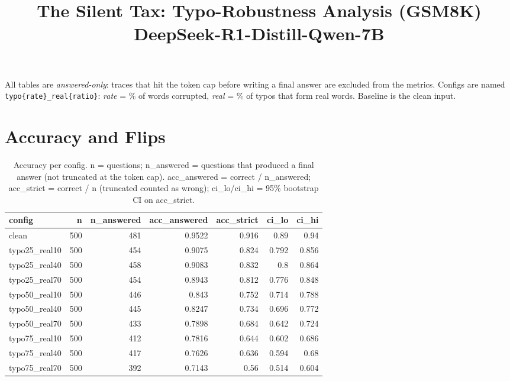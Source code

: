 \documentclass[11pt]{article}
\title{The Silent Tax: Typo-Robustness Analysis (GSM8K)\\\large DeepSeek-R1-Distill-Qwen-7B}
\date{}
\begin{document}
\maketitle
\noindent All tables are \emph{answered-only}: traces that hit the token cap before writing a final answer are excluded from the metrics. Configs are named \texttt{typo\{rate\}\_real\{ratio\}}: \emph{rate} = \% of words corrupted, \emph{real} = \% of typos that form real words. Baseline is the clean input.

\section*{Accuracy and Flips}
\begin{table}[H]
\centering
\caption{Accuracy per config. n = questions; n\_answered = questions that produced a final answer (not truncated at the token cap). acc\_answered = correct / n\_answered; acc\_strict = correct / n (truncated counted as wrong); ci\_lo/ci\_hi = 95\% bootstrap CI on acc\_strict.}
\small
\begin{adjustbox}{max width=\textwidth}
\begin{tabular}{lrrrrrr}
\toprule
\textbf{config} & \textbf{n} & \textbf{n\_answered} & \textbf{acc\_answered} & \textbf{acc\_strict} & \textbf{ci\_lo} & \textbf{ci\_hi} \\
\midrule
clean & 500 & 481 & 0.9522 & 0.916 & 0.89 & 0.94 \\
typo25\_real10 & 500 & 454 & 0.9075 & 0.824 & 0.792 & 0.856 \\
typo25\_real40 & 500 & 458 & 0.9083 & 0.832 & 0.8 & 0.864 \\
typo25\_real70 & 500 & 454 & 0.8943 & 0.812 & 0.776 & 0.848 \\
typo50\_real10 & 500 & 446 & 0.843 & 0.752 & 0.714 & 0.788 \\
typo50\_real40 & 500 & 445 & 0.8247 & 0.734 & 0.696 & 0.772 \\
typo50\_real70 & 500 & 433 & 0.7898 & 0.684 & 0.642 & 0.724 \\
typo75\_real10 & 500 & 412 & 0.7816 & 0.644 & 0.602 & 0.686 \\
typo75\_real40 & 500 & 417 & 0.7626 & 0.636 & 0.594 & 0.68 \\
typo75\_real70 & 500 & 392 & 0.7143 & 0.56 & 0.514 & 0.604 \\
\bottomrule
\end{tabular}
\end{adjustbox}
\end{table}
\end{document}
